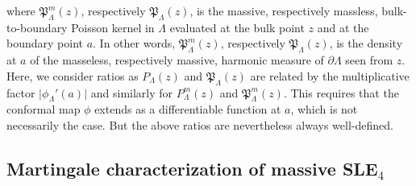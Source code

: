 \documentclass{article}
\theoremstyle{definition}
\theoremstyle{remark}
\theoremstyle{remark}
\begin{document}
where $\mathfrak{P}_{\Lambda}^m(z)$, respectively $\mathfrak{P}_{\Lambda}(z)$, is the massive, respectively massless, bulk-to-boundary Poisson kernel in $\Lambda$ evaluated at the bulk point $z$ and at the boundary point $a$. In other words, $\mathfrak{P}_{\Lambda}^m(z)$, respectively $\mathfrak{P}_{\Lambda}(z)$, is the density at $a$ of the masseless, respectively massive, harmonic measure of $\partial \Lambda$ seen from $z$. Here, we consider ratios as $P_{\Lambda}(z)$ and $\mathfrak{P}_{\Lambda}(z)$ are related by the multiplicative factor $\vert \phi_{\Lambda}'(a) \vert$ and similarly for $P_{\Lambda}^m(z)$ and $\mathfrak{P}_{\Lambda}^m(z)$. This requires that the conformal map $\phi$ extends as a differentiable function at $a$, which is not necessarily the case. But the above ratios are nevertheless always well-defined.

\subsection{Martingale characterization of massive SLE$_4$} \label{sec_proof_charac}
\end{document}
